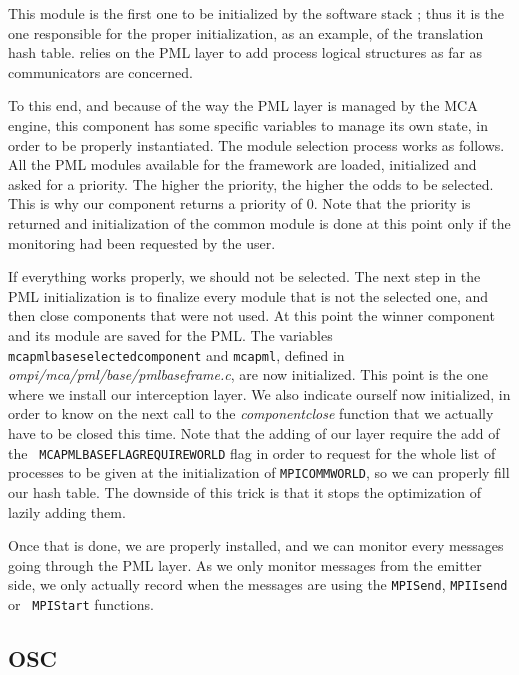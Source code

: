 This module is the first one to be initialized by the \ompi{} software
stack ; thus it is the one responsible for the proper initialization,
as an example, of the translation hash table. \ompi{} relies on the
PML layer to add process logical structures as far as communicators
are concerned.

To this end, and because of the way the PML layer is managed by the
MCA engine, this component has some specific variables to manage its
own state, in order to be properly instantiated. The module selection
process works as follows. All the PML modules available for the
framework are loaded, initialized and asked for a priority. The higher
the priority, the higher the odds to be selected. This is why our
component returns a priority of 0. Note that the priority is returned
and initialization of the common module is done at this point only if
the monitoring had been requested by the user.

If everything works properly, we should not be selected. The next step
in the PML initialization is to finalize every module that is not the
selected one, and then close components that were not used. At this
point the winner component and its module are saved for the PML. The
variables {\tt
  mca\brkunds{}pml\brkunds{}base\brkunds{}selected\brkunds{}component}
and {\tt mca\brkunds{}pml}, defined in {\it
  ompi/mca/pml/base/pml\brkunds{}base\brkunds{}frame.c}, are now
initialized. This point is the one where we install our interception
layer. We also indicate ourself now initialized, in order to know on
the next call to the {\it component\brkunds{}close} function that we
actually have to be closed this time. Note that the adding of our
layer require the add of the {\tt
  MCA\brkunds{}PML\brkunds{}BASE\brkunds{}FLAG\brkunds{}REQUIRE\brkunds{}WORLD}
flag in order to request for the whole list of processes to be given
at the initialization of {\tt MPI\brkunds{}COMM\brkunds{}WORLD}, so we
can properly fill our hash table. The downside of this trick is that
it stops the \ompi{} optimization of lazily adding them.

Once that is done, we are properly installed, and we can monitor every
messages going through the PML layer. As we only monitor messages from
the emitter side, we only actually record when the messages are using
the {\tt MPI\brkunds{}Send}, {\tt MPI\brkunds{}Isend} or {\tt
  MPI\brkunds{}Start} functions.

\subsection{OSC}
\label{subsec:TDI-osc}


